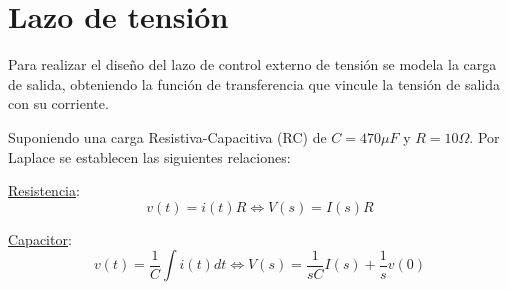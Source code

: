 \section{Lazo de tensión}
Para realizar el diseño del lazo de control externo de tensión se modela la carga de salida, obteniendo la función de transferencia que vincule la tensión de salida con su corriente. \par 
Suponiendo una carga Resistiva-Capacitiva (RC) de $C=470\mu F$ y $R=10\Omega$. Por Laplace se establecen las siguientes relaciones:\par 
\underline{Resistencia}:
\begin{equation}
v(t)=i(t)R \Leftrightarrow V(s)=I(s)R
\end{equation}\par 
\underline{Capacitor}:
\begin{equation}
v(t)=\frac{1}{C}\int i(t)dt \Leftrightarrow V(s)=\frac{1}{sC}I(s)+\frac{1}{s}v(0)
\end{equation}

